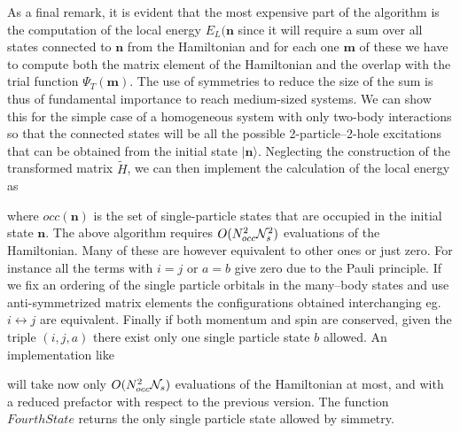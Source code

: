 As a final remark, it is evident that the most expensive part of the algorithm is the computation of the local energy $E_L(\mathbf{n}$ since it will require
a sum over all states connected to $\mathbf{n}$ from the Hamiltonian and for each one $\mathbf{m}$ of these we have to compute both the matrix element of 
the Hamiltonian and the overlap with the trial function $\Psi_T(\mathbf{m})$. The use of symmetries to reduce the size of the sum is thus
of fundamental importance to reach medium-sized systems. We can show this for the simple case of a homogeneous system with only two-body interactions
so that the connected states will be all the possible 2-particle--2-hole excitations that can be obtained from the initial state $\rvert\mathbf{n}\rangle$.
Neglecting the construction of the transformed matrix $\widetilde{H}$, we can then implement the calculation of the local energy as
\begin{svgraybox}
\begin{algorithmic} 
      \EndFor
    \EndFor
  \EndFor
\EndFor
{}
\end{algorithmic}
\end{svgraybox}
where $occ(\mathbf{n})$ is the set of single-particle states that are occupied in the initial state $\mathbf{n}$. The above algorithm requires $O(N_{occ}^2{\cal N}_s^2)$
evaluations of the Hamiltonian. Many of these are however equivalent to other ones or just zero. For instance all the terms with $i=j$ or $a=b$ give zero
due to the Pauli principle. If we fix an ordering of the single particle orbitals in the many--body states and use anti-symmetrized matrix elements the configurations 
obtained interchanging eg. $i\leftrightarrow j$ are equivalent. Finally if both momentum and spin are conserved, given the triple $(i,j,a)$ there exist only one single
particle state $b$ allowed. An implementation like
\begin{svgraybox}
\begin{algorithmic} 
      \EndIf
    \EndFor
  \EndFor
\EndFor
\end{algorithmic}
\end{svgraybox}
will take now only $O(N_{occ}^2{\cal N}_s)$ evaluations of the Hamiltonian at most, and with a reduced prefactor with respect to the previous version. The function $FourthState$ returns 
the only single particle state allowed by simmetry. 


